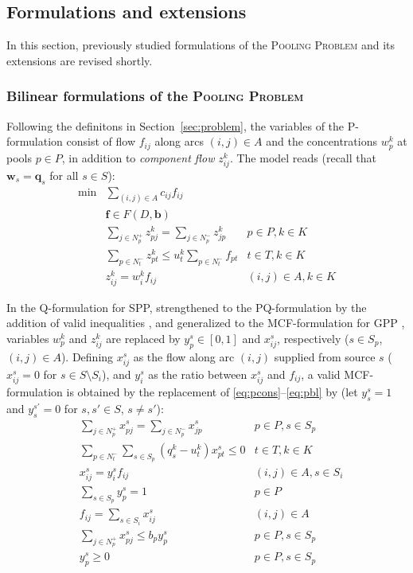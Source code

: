 \documentclass[pdflatex,sn-mathphys-num]{sn-jnl}%
\theoremstyle{thmstyleone}%
\begin{document}
\subsection{Formulations and extensions} \label{sec:formext}
In this section, previously studied formulations of the \textsc{Pooling Problem} and its extensions are revised shortly.

\subsubsection{Bilinear formulations of the \textsc{Pooling Problem}} \label{sec:form}
Following the definitons in Section~\ref{sec:problem}, the variables of the P-formulation \cite{haverly78} consist of
flow $f_{ij}$ along arcs $(i,j)\in A$ and the concentrations $w_p^k$ at pools $p\in P$, in addition to \emph{component flow} $z_{ij}^k$.
The model reads (recall that $\boldsymbol{w}_s=\boldsymbol{q}_s$ for all $s\in S$):
\begin{eqnarray}
\min & \sum_{(i,j)\in A}c_{ij}f_{ij} \nonumber \\
     & \boldsymbol{f}\in F(D,\boldsymbol{b}) \nonumber \\
     & \sum_{j\in N_p^+}z_{pj}^k = \sum_{j\in N_p^-}z_{jp}^k  & p\in P, k\in K \label{eq:pcons} \\
     & \sum_{p\in N_t^-}z_{pt}^k \leq u_t^k\sum_{p\in N_t^-}f_{pt} & t\in T, k\in K \label{eq:pqual} \\
     & z_{ij}^k = w_i^kf_{ij} & (i,j)\in A, k\in K \label{eq:pbl}
\end{eqnarray}

In the Q-formulation \cite{bental94} for SPP, strengthened to the PQ-formulation by the addition of valid inequalities \cite{sahinidis05},
and generalized to the MCF-formulation for GPP \cite{alfaki13b}, variables $w_p^k$ and $z_{ij}^k$ are replaced by
$y_p^s\in[0,1]$ and $x_{ij}^s$, respectively ($s\in S_p$, $(i,j)\in A$).
Defining $x_{ij}^s$ as the flow along arc $(i,j)$ supplied from source $s$ ($x_{ij}^s=0$ for $s\in S\setminus S_i$),
and $y_i^s$ as the ratio between $x_{ij}^s$ and $f_{ij}$,
a valid MCF-formulation is obtained by the replacement of \eqref{eq:pcons}--\eqref{eq:pbl} by
(let $y_s^s=1$ and $y_s^{s'}=0$ for $s,s'\in S$, $s\neq s'$):
\begin{eqnarray}
     & \sum_{j\in N_p^+}x_{pj}^s = \sum_{j\in N_p^-}x_{jp}^s  & p\in P, s\in S_p \label{eq:scons} \\
     & \sum_{p\in N_t^-}\sum_{s\in S_p}(q_s^k-u_t^k)x_{pt}^s \leq 0 & t\in T, k\in K \label{eq:squal} \\
     & x_{ij}^s = y_i^sf_{ij} & (i,j)\in A, s\in S_i \label{eq:sbl} \\
     & \sum_{s\in S_p}y_p^s = 1 & p\in P \label{eq:sconv} \\
     & f_{ij} = \sum_{s\in S_i}x_{ij}^s & (i,j)\in A \label{eq:svi1} \\
     & \sum_{j\in N_p^+}x_{pj}^s \leq b_py_p^s & p\in P, s\in S_p \label{eq:svi2} \\
     & y_p^s\geq 0 & p\in P, s\in S_p \label{eq:sy}
\end{eqnarray}
\end{document}
